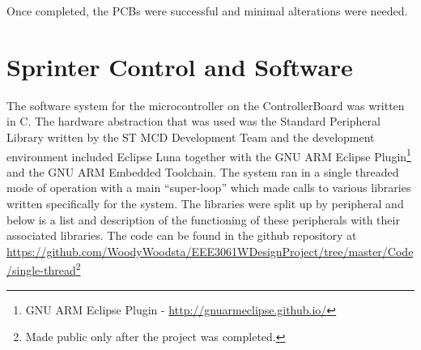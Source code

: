     Once completed, the PCBs were successful and minimal alterations were needed.
\clearpage
\section{Sprinter Control and Software}
\label{sec:Sprinter Control and Software}
  The software system for the microcontroller on the ControllerBoard was written in C. The hardware abstraction that was used was the Standard Peripheral Library written by the ST MCD Development Team and the development environment included Eclipse Luna together with the GNU ARM Eclipse Plugin\footnote{GNU ARM Eclipse Plugin - \url{http://gnuarmeclipse.github.io/}} and the GNU ARM Embedded Toolchain. The system ran in a single threaded mode of operation with a main ``super-loop'' which made calls to various libraries written specifically for the system. The libraries were split up by peripheral and below is a list and description of the functioning of these peripherals with their associated libraries. The code can be found in the github repository at \url{https://github.com/WoodyWoodsta/EEE3061WDesignProject/tree/master/Code/single-thread}\footnote{Made public only after the project was completed.}


